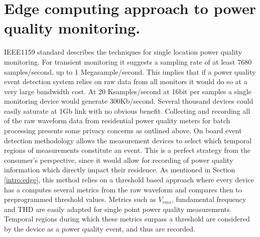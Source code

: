 \section{Edge computing approach to power quality monitoring.}

IEEE1159 standard describes the techniques for single location power quality monitoring. For transient monitoring it suggests a sampling rate of at least 7680 samples/second, up to 1 Megasample/second. This implies that if a power quality event detection system relies on raw data from all monitors it would do so at a very large bandwidth cost. At 20 Ksamples/second at 16bit per samples a single monitoring device would generate 300Kb/second. Several thousand devices could easily saturate at 1Gb link with no obvious benefit. Collecting and recording all of the raw waveform data from residential power quality meters for batch processing presents some privacy concerns as outlined above. On board event detection methodology allows the measurement devices to select which temporal regions of measurements constitute an event. This is a perfect strategy from the consumer's perspective, since it would allow for recording of power quality information which directly impact their residence. As mentioned in Section \ref{intro:edge}, this method relies on a threshold based approach where every device has a computes several metrics from the raw waveform and compares then to preprogrammed threshold values. Metrics such as $V_{rms}$, fundamental frequency and THD are easily adapted for single point power quality measurements. Temporal regions during which these metrics surpass a threshold are considered by the device as a power quality event, and thus are recorded. 

